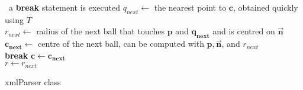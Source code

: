 \documentclass{article}
\begin{document}
\begin{algorithm}[tb]
	\DontPrintSemicolon{}
	\ {a \textbf{break} statement is executed} {
		$q_{next} \leftarrow$ the nearest point to $\mathbf{c}$, obtained quickly using $T$ \\
		$r_{next} \leftarrow$ radius of the next ball that touches $\mathbf{p}$ and $\mathbf{q_{next}}$ and is centred on $\vec{\mathbf{n}}$ \\
		$\mathbf{c_{next}} \leftarrow$ centre of the next ball, can be computed with $\mathbf{p}, \vec{\mathbf{n}}$, and $r_{next}$ \\
		 {
			\textbf{break}
		}
		$\mathbf{c} \leftarrow \mathbf{c_{next}}$ \\
		$r \leftarrow r_{next}$
	}
	\caption{xmlParser class}
	\label{alg:xmlParser}
\end{algorithm}
\end{document}
